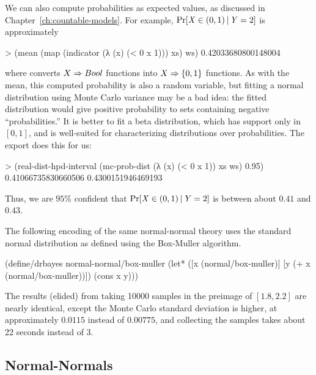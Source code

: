 We can also compute probabilities as expected values, as discussed in Chapter~\ref{ch:countable-models}.
For example, $\mathrm{Pr}\!\left[{\mathit{X} \in (0,1) \,|\, \mathit{Y} = 2}\right]$ is approximately
\begin{center}\singlespacing
\begin{schemedisplay}
> (mean (map (indicator (λ (x) (< 0 x 1))) xs) ws)
0.42033680800148004
\end{schemedisplay}
\end{center}
where  converts $X \Rightarrow Bool$ functions into $X \Rightarrow \{{0,1}\}$ functions.
As with the mean, this computed probability is also a random variable, but fitting a normal distribution using Monte Carlo variance may be a bad idea: the fitted distribution would give positive probability to sets containing negative ``probabilities.''
It is better to fit a beta distribution, which has support only in $[0,1]$, and is well-suited for characterizing distributions over probabilities.
The  export  does this for us:
\begin{center}\singlespacing
\begin{schemedisplay}
> (real-dist-hpd-interval
   (mc-prob-dist (λ (x) (< 0 x 1)) xs ws)
   0.95)
0.41066735830660506
0.4300151946469193
\end{schemedisplay}
\end{center}
Thus, we are $95\%$ confident that $\mathrm{Pr}\!\left[{\mathit{X} \in (0,1) \,|\, \mathit{Y} = 2}\right]$ is between about $0.41$ and $0.43$.

The following encoding of the same normal-normal theory uses the standard normal distribution as defined using the Box-Muller algorithm.
\begin{center}\singlespacing
\begin{schemedisplay}
(define/drbayes normal-normal/box-muller
  (let* ([x  (normal/box-muller)]
         [y  (+ x (normal/box-muller))])
    (cons x y)))
\end{schemedisplay}
\end{center}
The results (elided) from taking 10000 samples in the preimage of $[1.8,2.2]$ are nearly identical, except the Monte Carlo standard deviation is higher, at approximately $0.0115$ instead of $0.00775$, and collecting the samples takes about 22 seconds instead of 3.

\subsection{Normal-Normals}

